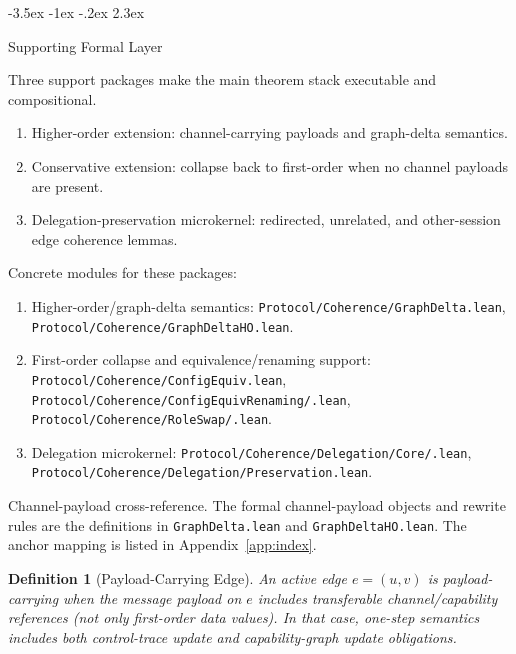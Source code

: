 \documentclass[a4paper,10pt,twocolumn,english]{article}
\makeatletter
\renewcommand{\section}{\@startsection{section}{1}{\z@}%
  {-3.5ex \@plus -1ex \@minus -.2ex}%
  {2.3ex}%
  {\raggedright\normalfont\large\bfseries}}
\numberwithin{equation}{section}
\theoremstyle{paperdef}
\newtheorem{definition}{Definition}[section]
\theoremstyle{paperplain}
\theoremstyle{paperdef}
\theoremstyle{paperremark}
\theoremstyle{paperdef}
\makeatother
\begin{document}
\section{Supporting Formal Layer}
\label{sec:supporting}

Three support packages make the main theorem stack executable and compositional.

	{\footnotesize
		\begin{enumerate}
			\item Higher-order extension: channel-carrying payloads and graph-delta semantics.
			\item Conservative extension: collapse back to first-order when no channel payloads are present.
			\item Delegation-preservation microkernel: redirected, unrelated, and other-session edge coherence lemmas.
		\end{enumerate}
	}

Concrete modules for these packages:
\begin{enumerate}
	\item Higher-order/graph-delta semantics:
	      \texttt{Protocol/\allowbreak Coherence/\allowbreak GraphDelta.lean},
	      \texttt{Protocol/\allowbreak Coherence/\allowbreak GraphDeltaHO.lean}.
	\item First-order collapse and equivalence/renaming support:
	      \texttt{Protocol/\allowbreak Coherence/\allowbreak ConfigEquiv.lean},
	      \texttt{Protocol/\allowbreak Coherence/\allowbreak ConfigEquivRenaming/\allowbreak *.lean},
	      \texttt{Protocol/\allowbreak Coherence/\allowbreak RoleSwap/\allowbreak *.lean}.
	\item Delegation microkernel:
	      \texttt{Protocol/\allowbreak Coherence/\allowbreak Delegation/\allowbreak Core/\allowbreak *.lean},
	      \texttt{Protocol/\allowbreak Coherence/\allowbreak Delegation/\allowbreak Preservation.lean}.
\end{enumerate}

Channel-payload cross-reference. The formal channel-payload objects and rewrite rules are the definitions in \texttt{GraphDelta.lean} and \texttt{GraphDeltaHO.lean}. The anchor mapping is listed in Appendix~\ref{app:index}.

\begin{definition}[Payload-Carrying Edge]
	An active edge $e=(u,v)$ is payload-carrying when the message payload on $e$
	includes transferable channel/capability references (not only first-order data
	values). In that case, one-step semantics includes both control-trace update and
	capability-graph update obligations.
\end{definition}
\end{document}
